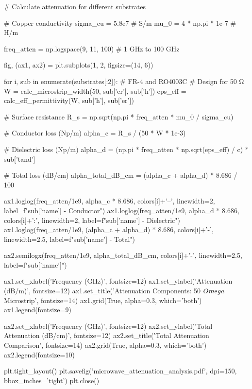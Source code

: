 \documentclass[11pt,a4paper]{article}
\begin{document}
\begin{pycode}
# Calculate attenuation for different substrates

# Copper conductivity
sigma_cu = 5.8e7  # S/m
mu_0 = 4 * np.pi * 1e-7  # H/m

freq_atten = np.logspace(9, 11, 100)  # 1 GHz to 100 GHz

fig, (ax1, ax2) = plt.subplots(1, 2, figsize=(14, 6))

for i, sub in enumerate(substrates[:2]):  # FR-4 and RO4003C
    # Design for 50 Ω
    W = calc_microstrip_width(50, sub['er'], sub['h'])
    eps_eff = calc_eff_permittivity(W, sub['h'], sub['er'])

    # Surface resistance
    R_s = np.sqrt(np.pi * freq_atten * mu_0 / sigma_cu)

    # Conductor loss (Np/m)
    alpha_c = R_s / (50 * W * 1e-3)

    # Dielectric loss (Np/m)
    alpha_d = (np.pi * freq_atten * np.sqrt(eps_eff) / c) * sub['tand']

    # Total loss (dB/cm)
    alpha_total_dB_cm = (alpha_c + alpha_d) * 8.686 / 100

    ax1.loglog(freq_atten/1e9, alpha_c * 8.686, colors[i]+'--',
              linewidth=2, label=f"{sub['name']} - Conductor")
    ax1.loglog(freq_atten/1e9, alpha_d * 8.686, colors[i]+':',
              linewidth=2, label=f"{sub['name']} - Dielectric")
    ax1.loglog(freq_atten/1e9, (alpha_c + alpha_d) * 8.686, colors[i]+'-',
              linewidth=2.5, label=f"{sub['name']} - Total")

    ax2.semilogx(freq_atten/1e9, alpha_total_dB_cm, colors[i]+'-',
                linewidth=2.5, label=f"{sub['name']}")

ax1.set_xlabel('Frequency (GHz)', fontsize=12)
ax1.set_ylabel('Attenuation (dB/m)', fontsize=12)
ax1.set_title('Attenuation Components: 50 $\\Omega$ Microstrip', fontsize=14)
ax1.grid(True, alpha=0.3, which='both')
ax1.legend(fontsize=9)

ax2.set_xlabel('Frequency (GHz)', fontsize=12)
ax2.set_ylabel('Total Attenuation (dB/cm)', fontsize=12)
ax2.set_title('Total Attenuation Comparison', fontsize=14)
ax2.grid(True, alpha=0.3, which='both')
ax2.legend(fontsize=10)

plt.tight_layout()
plt.savefig('microwave_attenuation_analysis.pdf', dpi=150, bbox_inches='tight')
plt.close()
\end{pycode}
\end{document}
